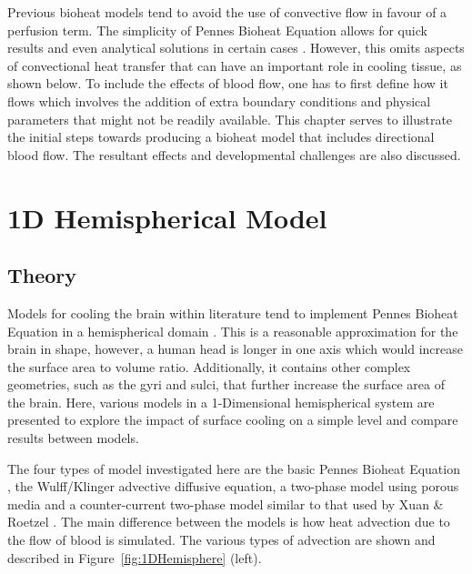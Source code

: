 \documentclass[11pt,english,a4paper,twoside,openright]{report}
\begin{document}
{{{{{{{{Previous bioheat models tend to avoid the use of convective flow in favour of a perfusion term. The simplicity of Pennes Bioheat Equation allows for quick results and even analytical solutions in certain cases	 \cite{okajima2009dimensionless}\cite{shih2007analytical}. However, this omits aspects of convectional heat transfer that can have an important role in cooling tissue, as shown below. To include the effects of blood flow, one has to first define how it flows which involves the addition of extra boundary conditions and physical parameters that might not be readily available. This chapter serves to illustrate the initial steps towards producing a bioheat model that includes directional blood flow. The resultant effects and developmental challenges are also discussed. 

\section[1D Hemispherical Model]{{\Large 1D H}emispherical {\Large M}odel}
\label{Sec:21DHemisphere}

\subsection{Theory}
\label{Sec:21DHemisphereTheory}

Models for cooling the brain within literature tend to implement Pennes Bioheat Equation in a hemispherical domain \cite{nelson1998brain}\cite{zhu2001theoretical}. This is a reasonable approximation for the brain in shape, however, a human head is longer in one axis which would increase the surface area to volume ratio. Additionally, it contains other complex geometries, such as the gyri and sulci, that further increase the surface area of the brain. Here, various models in a 1-Dimensional hemispherical system are presented to explore the impact of surface cooling on a simple level and compare results between models. 

The four types of model investigated here are the basic Pennes Bioheat Equation \cite{pennes1948analysis}, the Wulff/Klinger \cite{wulff1974energy,klinger1978heat} advective diffusive equation, a two-phase model using porous media and a counter-current two-phase model similar to that used by Xuan \& Roetzel \cite{xuan1997bioheat}. The main difference between the models is how heat advection due to the flow of blood is simulated. The various types of advection are shown and described in Figure~\ref{fig:1DHemisphere} (left).

}}}}}}}}
\end{document}
